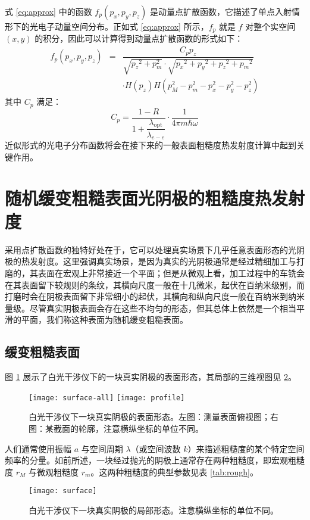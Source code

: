 式 \ref{eq:approx} 中的函数 $f_p(p_x, p_y, p_z)$ 是动量点扩散函数，它描述了单点入射情形下的光电子动量空间分布。正如式 \ref{eq:approx} 所示，$f_p$ 就是 $f$ 对整个实空间 $(x, y)$ 的积分，因此可以计算得到动量点扩散函数的形式如下：
\begin{eqnarray}
f_p(p_x,p_y,p_z) &=& \dfrac{C_p p_z}{\sqrt{{p_z}^2+p_m^2}\cdot\sqrt{{p_x}^2+{p_y}^2+{p_z}^2+{p_m}^2}}\nonumber\\
&&\cdot H(p_z)H(p_M^2-p_m^2-p_x^2-p_y^2-p_z^2)
\label{eq:ppsf}
\end{eqnarray}
其中 $C_p$ 满足：
\[
C_p = \dfrac{1-R}{1+\dfrac{\lambda_{\text{opt}}}{\lambda_{e-e}}}\cdot\dfrac{1}{4\pi m\hbar\omega}
\]
近似形式的光电子分布函数将会在接下来的一般表面粗糙度热发射度计算中起到关键作用。

\section{\label{s:ana}随机缓变粗糙表面光阴极的粗糙度热发射度}
采用点扩散函数的独特好处在于，它可以处理真实场景下几乎任意表面形态的光阴极的热发射度。这里强调真实场景，是因为真实的光阴极通常是经过精细加工与打磨的，其表面在宏观上非常接近一个平面；但是从微观上看，加工过程中的车铣会在其表面留下较规则的条纹，其横向尺度一般在十几微米，起伏在百纳米级别，而打磨时会在阴极表面留下非常细小的起伏，其横向和纵向尺度一般在百纳米到纳米量级。尽管真实阴极表面会存在这些不均匀的形态，但其总体上依然是一个相当平滑的平面，我们称这种表面为随机缓变粗糙表面。

\subsection{缓变粗糙表面}
图 \ref{fig:rough} 展示了白光干涉仪下的一块真实阴极的表面形态，其局部的三维视图见 \ref{fig:rough-3D}。
\begin{figure}[htbp]
\centering
\texttt{[image: surface-all]}
\texttt{[image: profile]}
\caption{\label{fig:rough} 白光干涉仪下一块真实阴极的表面形态。左图：测量表面俯视图；右图：某截面的轮廓，注意横纵坐标的单位不同。}
\end{figure}

人们通常使用振幅 $a$ 与空间周期 $\lambda$（或空间波数 $k$）来描述粗糙度的某个特定空间频率的分量。如前所述，一块经过抛光的阴极上通常存在两种粗糙度，即宏观粗糙度 $r_M$ 与微观粗糙度 $r_m$。这两种粗糙度的典型参数见表 \ref{tab:rough}。

\begin{figure}[htbp]
\centering
\texttt{[image: surface]}
\caption{\label{fig:rough-3D} 白光干涉仪下一块真实阴极的局部形态。注意横纵坐标的单位不同。}
\end{figure}


